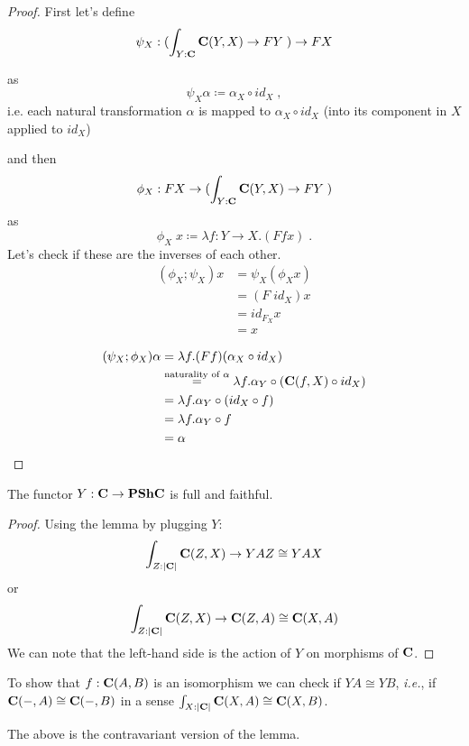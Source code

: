 \documentclass[acmsmall,screen, nonacm, anonymous]{acmart}
\begin{document}
\begin{proof}

First let's define 
\[
\psi_{X} : (\int_{Y : \mathbf{C}}\mathbf{C}(Y,X) \to FY\;) \to FX
\]

as
\[
\psi_{X} \alpha \coloneq \alpha_{X} \circ id_{X}\;,
\]
i.e. each natural transformation $\alpha$ is mapped to $\alpha_X \circ id_{X}$ (into its component in $X$ applied to $id_{X}$)

and then
\[
\phi_{X} : FX \to (\int_{Y : \mathbf{C}}\mathbf{C}(Y,X) \to FY \;)
\]
as
\[
\phi_{X}\; x \coloneq \lambda f : Y \to X . (Ff x)\;.
\]
Let's check if these are the inverses of each other.
\begin{align*}
(\phi_{X};\psi_{X}) x &= \psi_{X}(\phi_{X} x)\\ 
 &= (F\;id_{X}) x\\
 &= id_{F_{X}} x\\
 &= x
\end{align*}

\begin{align*}
 (\psi_{X};\phi_{X}) \alpha &= \lambda f . (Ff) (\alpha_{X} \circ id_{X})\\
  &\overset{\text{naturality of } \alpha}{=} \lambda f . \alpha_{Y} \circ (\mathbf{C}(f,X) \circ id_{X})\\
  &= \lambda f . \alpha_{Y} \circ (id_{X} \circ f)\\
  &= \lambda f . \alpha_{Y} \circ f\\
  &= \alpha
\end{align*}
\end{proof}

\begin{corollary}
    The functor $Y : \mathbf{C} \to \mathbf{PShC}$ is full and faithful.
\end{corollary}
\begin{proof}

Using the lemma by plugging $Y$:
\[
\int_{Z : |\mathbf{C}|} \mathbf{C}(Z,X) \to YAZ \cong YAX
\]
or
\[
    \int_{Z : |\mathbf{C}|} \mathbf{C}(Z,X) \to \mathbf{C}(Z,A) \cong \mathbf{C}(X,A)
\]
We can note that the left-hand side is the action of $Y$ on morphisms of $\mathbf{C}$.
\end{proof}

To show that $f : \mathbf{C}(A,B)$ is an isomorphism we can check if $YA \cong YB$, \textit{i.e.}, if $\mathbf{C}(-,A) \cong \mathbf{C}(-,B)$ in a sense $\int_{X : |\mathbf{C}|} \mathbf{C}(X,A) \cong \mathbf{C}(X,B)$.

\begin{remark}
    The above is the contravariant version of the lemma.
\end{remark}
\end{document}
